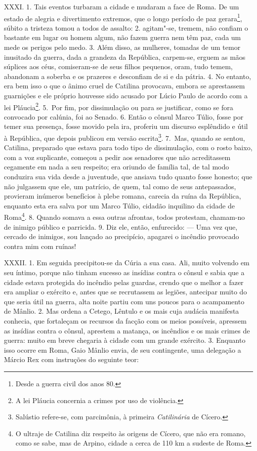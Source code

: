 XXXI. 1. Tais eventos turbaram a cidade e mudaram a face de Roma. De um estado
de alegria e divertimento extremos, que o longo período de paz
gerara\footnote{Desde a guerra civil dos anos 80.}, súbito a tristeza tomou a
todos de assalto: 2. agitam"-se, tremem, não confiam o bastante em lugar ou
homem algum, não fazem guerra nem têm paz, cada um mede os perigos pelo medo.
3. Além disso, as mulheres, tomadas de um temor inusitado da guerra, dada a
grandeza da República, carpem-se, erguem as mãos súplices aos céus,
comiseram-se de seus filhos pequenos, oram, tudo temem, abandonam a soberba e
os prazeres e desconfiam de si e da pátria. 4. No entanto, era bem isso o que o
ânimo cruel de Catilina provocava, embora se aprestassem guarnições e ele
próprio houvesse sido acusado por Lúcio Paulo de acordo com a lei
Pláucia\footnote{A lei Pláucia concernia a crimes por uso de violência.}. 5.~Por fim,
por dissimulação ou para se justificar, como se fora convocado por
calúnia, foi ao Senado. 6. Então o cônsul Marco Túlio, fosse por temer sua
presença, fosse movido pela ira, proferiu um discurso esplêndido e útil à
República, que depois publicou em versão escrita\footnote{Salústio refere-se,
com parcimônia, à primeira \emph{Catilinária} de Cícero.}. 7.~Mas, quando se
sentou, Catilina, preparado que estava para todo tipo de dissimulação, com o
rosto baixo, com a voz suplicante, começou a pedir aos senadores que não
acreditassem cegamente em nada a seu respeito; era oriundo de família tal, de
tal modo conduzira sua vida desde a juventude, que ansiava tudo quanto fosse
honesto; que não julgassem que ele, um patrício, de quem, tal como de seus
antepassados, provieram inúmeros benefícios à plebe romana, carecia da ruína da
República, enquanto esta era salva por um Marco Túlio, cidadão inquilino da
cidade de Roma\footnote{O ultraje de Catilina diz respeito às origens de
Cícero, que não era romano, como se sabe, mas de Arpino, cidade a cerca de 110
km a sudeste de Roma.}. 8. Quando somava a essa outras afrontas, todos
protestam, chamam-no de inimigo público e parricida. 9. Diz ele, então,
enfurecido: --- Uma vez que, cercado de inimigos, sou lançado ao precipício,
apagarei o incêndio provocado contra mim com ruínas!

XXXII. 1. Em seguida precipitou-se da Cúria a sua casa. Ali, muito volvendo em
seu íntimo, porque não tinham sucesso as insídias contra o cônsul e sabia que a
cidade estava protegida do incêndio pelas guardas, crendo que o melhor a fazer
era ampliar o exército e, antes que se recrutassem as legiões, antecipar muito
do que seria útil na guerra, alta noite partiu com uns poucos para o
acampamento de Mânlio. 2. Mas ordena a Cetego, Lêntulo e os mais cuja audácia
manifesta conhecia, que fortaleçam os recursos da facção com os meios
possíveis, apressem as insídias contra o cônsul, aprestem a matança, os
incêndios e os mais crimes de guerra: muito em breve chegaria à cidade com um
grande exército. 3. Enquanto isso ocorre em Roma, Gaio Mânlio envia, de seu contingente, uma delegação  a Márcio
Rex com instruções do seguinte teor:


